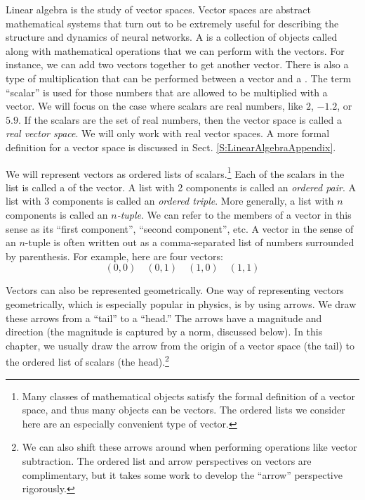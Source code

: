     Linear algebra is the study of vector spaces. Vector spaces are abstract
mathematical systems that turn out to be extremely useful for describing the 
structure and dynamics of neural networks. A  is a 
collection of objects called  along with mathematical 
operations that we can perform with the vectors. For instance, we can add two vectors together to get another vector. There is also a type of 
multiplication that can be performed between a vector and a . The term ``scalar'' is used for those numbers that are allowed to be 
multiplied with a vector. We will focus on the case where scalars are real numbers, like $2$, $-1.2$, or $5.9$. If the scalars are the set of real numbers, then the 
vector space is called a {\em real vector space}. We will only work with real
vector spaces. A more formal definition for a vector space is discussed in 
Sect. \ref{S:LinearAlgebraAppendix}. 

We will represent vectors as ordered lists of scalars.\footnote{ Many classes of mathematical objects satisfy the formal definition of a vector space, and thus many objects can be vectors. The ordered lists we consider here are an especially convenient type of vector.} Each of the scalars in the list is called a  
of the vector. A list with 2 components is called an {\em ordered pair}. A 
list with 3 components is called an {\em ordered triple}. More generally, a
list with $n$ components is called an {\em $n$-tuple}. We can refer to the
members of a vector in this sense  as its ``first component'',  ``second component'', etc.
A vector in the sense of an $n$-tuple is often 
written out as a comma-separated list of numbers surrounded by parenthesis. 
For example, here are four vectors:
\begin{equation*}
    (0,0) \quad (0,1) \quad (1,0) \quad (1,1) 
\end{equation*}

Vectors can also be represented geometrically. One way of representing vectors geometrically, which is especially popular in physics, is by using arrows. We draw these arrows from a ``tail'' to a ``head.''  The arrows have a magnitude and direction (the magnitude is captured by a norm, discussed below). In this chapter, we usually draw the arrow from the origin of a vector space (the tail) to the ordered list of scalars (the head).\footnote{We can also shift these arrows around when performing operations like vector subtraction. The ordered list and arrow perspectives on vectors are complimentary, but it takes some work to develop the ``arrow'' perspective rigorously.}\label{headTail}

